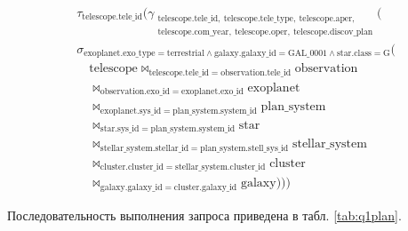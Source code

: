 \documentclass[14pt,a4paper]{extarticle}
\begin{document}
\[
\begin{aligned}
&\tau_{\mathrm{telescope.tele\_id}}\Big(
\gamma_{\substack{
\mathrm{telescope.tele\_id,\ telescope.tele\_type,\ telescope.aper,}\\
\mathrm{telescope.com\_year,\ telescope.oper,\ telescope.discov\_plan}
}}\Big(\\
&\sigma_{\mathrm{
exoplanet.exo\_type = terrestrial \land galaxy.galaxy\_id = GAL\_0001 \land star.class = G
}}\Big(
\\
&\quad
\mathrm{telescope}
\bowtie_{\mathrm{telescope.tele\_id = observation.tele\_id}}
\mathrm{observation}
\\
&\quad
\bowtie_{\mathrm{observation.exo\_id = exoplanet.exo\_id}}
\mathrm{exoplanet}
\\
&\quad
\bowtie_{\mathrm{exoplanet.sys\_id = plan\_system.system\_id}}
\mathrm{plan\_system}
\\
&\quad
\bowtie_{\mathrm{star.sys\_id = plan\_system.system\_id}}
\mathrm{star}
\\
&\quad
\bowtie_{\mathrm{stellar\_system.stellar\_id = plan\_system.stell\_sys\_id}}
\mathrm{stellar\_system}
\\
&\quad
\bowtie_{\mathrm{cluster.cluster\_id = stellar\_system.cluster\_id}}
\mathrm{cluster}
\\
&\quad
\bowtie_{\mathrm{galaxy.galaxy\_id = cluster.galaxy\_id}}
\mathrm{galaxy}
\Big)\Big)\Big)
\end{aligned}
\]

Последовательность выполнения запроса приведена в табл. \ref{tab:q1plan}.
\end{document}
